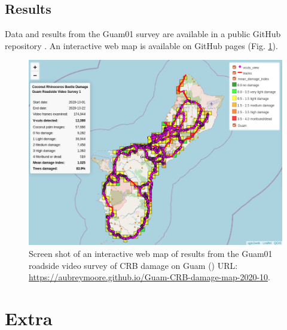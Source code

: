 \documentclass[12pt,letterpaper,english,bibliography=totocnumbered, abstract=on]{scrartcl}
\begin{document}
\subsection{Results}

Data and results from the Guam01 survey are available in a public GitHub repository \cite{mooreGitHubRepositoryGuamCRBdamagemap2020102020}. An interactive web map is available on GitHub pages (Fig. \ref{fig:guam01webmap}).

\begin{figure}[H]
	\centering
	\includegraphics[width=\linewidth]{images/Guam01_webmap}
	\caption{Screen shot of an interactive web map of results from the Guam01 roadside video survey of CRB damage on Guam (\cite{mooreWebMapGuamCRBdamagemap2020102020}) URL: \url{https://aubreymoore.github.io/Guam-CRB-damage-map-2020-10}.}
	\label{fig:guam01webmap}
\end{figure}


\section{Extra}

\cite{aubreymooreSetAutomatedRoadside2020}

\cite{onepanelinc.AIPipelineOperations2020}

\cite{onepanelinc.ScopeWorkObject2020}

\printbibliography	
\end{document}
